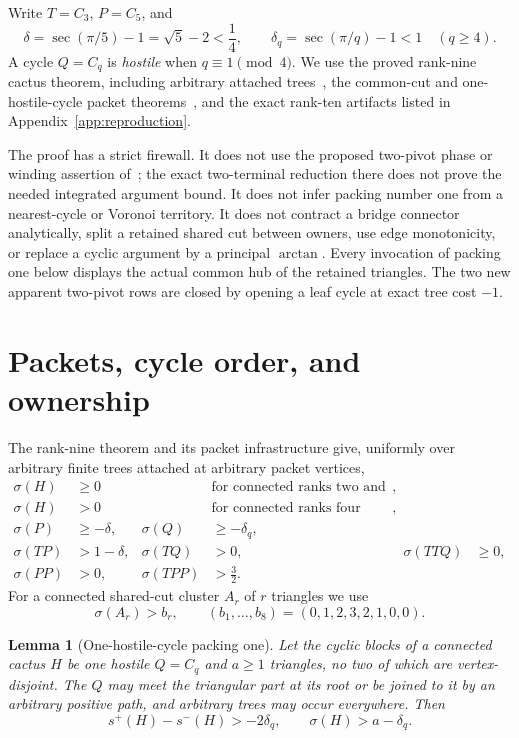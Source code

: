 \documentclass[11pt]{article}
\newtheorem{lemma}[theorem]{Lemma}
\newcommand{\spE}{s^+}
\newcommand{\smE}{s^-}
\newcommand{\sig}{\sigma}
\begin{document}
Write $T=C_3$, $P=C_5$, and
\[
 \delta=\sec(\pi/5)-1=\sqrt5-2<\frac14,
 \qquad \delta_q=\sec(\pi/q)-1<1\quad(q\geq4).
\]
A cycle $Q=C_q$ is \emph{hostile} when $q\equiv1\pmod4$.  We use the proved
rank-nine cactus theorem, including arbitrary attached trees~\cite{RankNine},
the common-cut and one-hostile-cycle packet theorems~\cite{CommonCut,Packing},
and the exact rank-ten artifacts listed in Appendix~\ref{app:reproduction}.

The proof has a strict firewall.  It does not use the proposed two-pivot phase
or winding assertion of~\cite{TwoPivot}; the exact two-terminal reduction there
does not prove the needed integrated argument bound.  It does not infer
packing number one from a nearest-cycle or Voronoi territory.  It does not
contract a bridge connector analytically, split a retained shared cut between
owners, use edge monotonicity, or replace a cyclic argument by a principal
$\arctan$.  Every invocation of packing one below displays the actual common
hub of the retained triangles.  The two new apparent two-pivot rows are closed
by opening a leaf cycle at exact tree cost $-1$.

\section{Packets, cycle order, and ownership}

The rank-nine theorem and its packet infrastructure give, uniformly over
arbitrary finite trees attached at arbitrary packet vertices,
\begin{align}
 \sig(H)&\geq0 &&\text{for connected ranks two and three},\label{eq:low0}\\
 \sig(H)&>0 &&\text{for connected ranks four through nine},\label{eq:lowpos}\\
 \sig(P)&\geq-\delta,& \sig(Q)&\geq-\delta_q,\label{eq:hostile}\\
 \sig(TP)&>1-\delta,& \sig(TQ)&>0,& \sig(TTQ)&\geq0,\label{eq:mixed}\\
 \sig(PP)&>0,& \sig(TPP)&>\frac32.\label{eq:pp}
\end{align}
For a connected shared-cut cluster $A_r$ of $r$ triangles we use
\begin{equation}\label{eq:triangle}
 \sig(A_r)>b_r,
 \qquad (b_1,\ldots,b_8)=(0,1,2,3,2,1,0,0).
\end{equation}

\begin{lemma}[One-hostile-cycle packing one]\label{lem:packing}
Let the cyclic blocks of a connected cactus $H$ be one hostile $Q=C_q$ and
$a\geq1$ triangles, no two of which are vertex-disjoint.  The $Q$ may meet the
triangular part at its root or be joined to it by an arbitrary positive path,
and arbitrary trees may occur everywhere.  Then
\[
 \spE(H)-\smE(H)>-2\delta_q,
 \qquad \sig(H)>a-\delta_q.
\]
\end{lemma}
\end{document}

